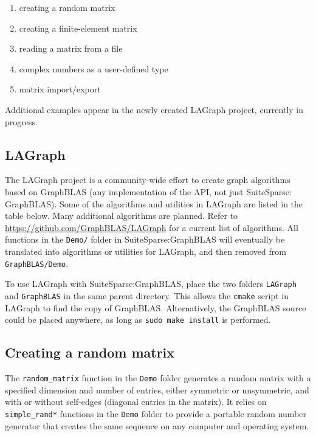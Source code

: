 \documentclass[12pt]{article}
\begin{document}
{\begin{enumerate}
\item creating a random matrix
\item creating a finite-element matrix
\item reading a matrix from a file
\item complex numbers as a user-defined type
\item matrix import/export
\end{enumerate}

Additional examples appear in the newly created LAGraph project, currently in
progress.

\subsection{LAGraph}
\label{lagraph}

The LAGraph project is a community-wide effort to create graph algorithms based
on GraphBLAS (any implementation of the API, not just SuiteSparse: GraphBLAS).
Some of the algorithms and utilities in LAGraph are listed in the table below.
Many additional algorithms are planned.  Refer to
\url{https://github.com/GraphBLAS/LAGraph} for a current list of algorithms. All
functions in the \verb'Demo/' folder in SuiteSparse:GraphBLAS will eventually
be translated into algorithms or utilities for LAGraph, and then removed
from \verb'GraphBLAS/Demo'.

To use LAGraph with SuiteSparse:GraphBLAS, place the two folders \verb'LAGraph'
and \verb'GraphBLAS' in the same parent directory.  This allows the
\verb'cmake' script in LAGraph to find the copy of GraphBLAS.  Alternatively,
the GraphBLAS source could be placed anywhere, as long as
\verb'sudo make install' is performed.

\subsection{Creating a random matrix}
\label{random}

The \verb'random_matrix' function in the \verb'Demo' folder generates a random
matrix with a specified dimension and number of entries, either symmetric or
unsymmetric, and with or without self-edges (diagonal entries in the matrix).
It relies on \verb'simple_rand*' functions in the \verb'Demo' folder to provide
a portable random number generator that creates the same sequence on any
computer and operating system.

}
\end{document}
